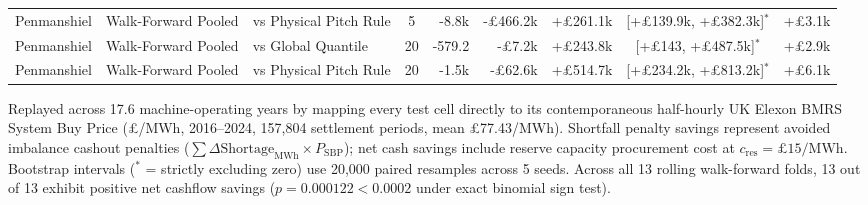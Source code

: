 \begin{table}[t]
\begin{tabular*}{\textwidth}{@{\extracolsep{\fill}}lllcrrrcr@{}}
Penmanshiel & Walk-Forward Pooled & vs Physical Pitch Rule & 5 & -8.8k & -£466.2k & +£261.1k & [+£139.9k, +£382.3k]$^*$ & +£3.1k \\
Penmanshiel & Walk-Forward Pooled & vs Global Quantile & 20 & -579.2 & -£7.2k & +£243.8k & [+£143, +£487.5k]$^*$ & +£2.9k \\
Penmanshiel & Walk-Forward Pooled & vs Physical Pitch Rule & 20 & -1.5k & -£62.6k & +£514.7k & [+£234.2k, +£813.2k]$^*$ & +£6.1k \\
\midrule
\bottomrule
\end{tabular*}
\vspace{1mm}
\footnotesize Replayed across 17.6 machine-operating years by mapping every test cell directly to its contemporaneous half-hourly UK Elexon BMRS System Buy Price (£/MWh, 2016--2024, 157,804 settlement periods, mean £77.43/MWh). Shortfall penalty savings represent avoided imbalance cashout penalties ($\sum \Delta\text{Shortage}_{\mathrm{MWh}} \times P_{\mathrm{SBP}}$); net cash savings include reserve capacity procurement cost at $c_{\mathrm{res}} = £15/\text{MWh}$. Bootstrap intervals ($^*$ = strictly excluding zero) use 20,000 paired resamples across 5 seeds. Across all 13 rolling walk-forward folds, 13 out of 13 exhibit positive net cashflow savings ($p = 0.000122 < 0.0002$ under exact binomial sign test).
\end{table}
